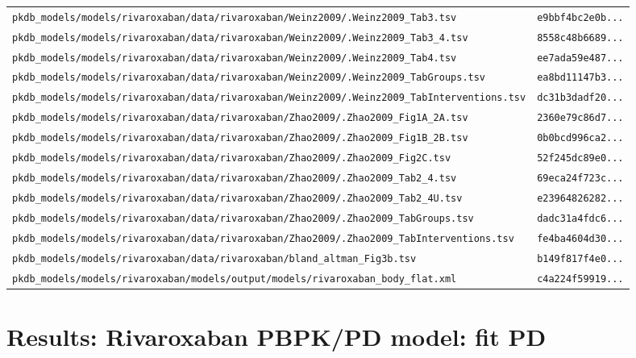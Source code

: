 \begin{longtable}{ll}
\texttt{pkdb\_models/models/rivaroxaban/data/rivaroxaban/Weinz2009/.Weinz2009\_Tab3.tsv} & \texttt{e9bbf4bc2e0b...} \\
\texttt{pkdb\_models/models/rivaroxaban/data/rivaroxaban/Weinz2009/.Weinz2009\_Tab3\_4.tsv} & \texttt{8558c48b6689...} \\
\texttt{pkdb\_models/models/rivaroxaban/data/rivaroxaban/Weinz2009/.Weinz2009\_Tab4.tsv} & \texttt{ee7ada59e487...} \\
\texttt{pkdb\_models/models/rivaroxaban/data/rivaroxaban/Weinz2009/.Weinz2009\_TabGroups.tsv} & \texttt{ea8bd11147b3...} \\
\texttt{pkdb\_models/models/rivaroxaban/data/rivaroxaban/Weinz2009/.Weinz2009\_TabInterventions.tsv} & \texttt{dc31b3dadf20...} \\
\texttt{pkdb\_models/models/rivaroxaban/data/rivaroxaban/Zhao2009/.Zhao2009\_Fig1A\_2A.tsv} & \texttt{2360e79c86d7...} \\
\texttt{pkdb\_models/models/rivaroxaban/data/rivaroxaban/Zhao2009/.Zhao2009\_Fig1B\_2B.tsv} & \texttt{0b0bcd996ca2...} \\
\texttt{pkdb\_models/models/rivaroxaban/data/rivaroxaban/Zhao2009/.Zhao2009\_Fig2C.tsv} & \texttt{52f245dc89e0...} \\
\texttt{pkdb\_models/models/rivaroxaban/data/rivaroxaban/Zhao2009/.Zhao2009\_Tab2\_4.tsv} & \texttt{69eca24f723c...} \\
\texttt{pkdb\_models/models/rivaroxaban/data/rivaroxaban/Zhao2009/.Zhao2009\_Tab2\_4U.tsv} & \texttt{e23964826282...} \\
\texttt{pkdb\_models/models/rivaroxaban/data/rivaroxaban/Zhao2009/.Zhao2009\_TabGroups.tsv} & \texttt{dadc31a4fdc6...} \\
\texttt{pkdb\_models/models/rivaroxaban/data/rivaroxaban/Zhao2009/.Zhao2009\_TabInterventions.tsv} & \texttt{fe4ba4604d30...} \\
\texttt{pkdb\_models/models/rivaroxaban/data/rivaroxaban/bland\_altman\_Fig3b.tsv} & \texttt{b149f817f4e0...} \\
\texttt{pkdb\_models/models/rivaroxaban/models/output/models/rivaroxaban\_body\_flat.xml} & \texttt{c4a224f59919...} \\
\end{longtable}

\section{Results: Rivaroxaban PBPK/PD model: fit PD}

